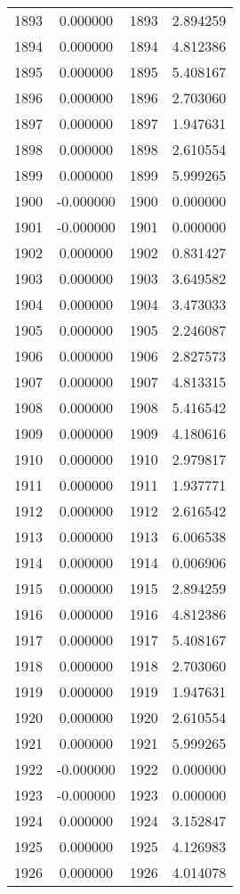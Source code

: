\documentclass[12pt]{article}
\begin{document}
\begin{longtable}{@{}cccc@{}}
1893 & 0.000000 & 1893 & 2.894259 \\
1894 & 0.000000 & 1894 & 4.812386 \\
1895 & 0.000000 & 1895 & 5.408167 \\
1896 & 0.000000 & 1896 & 2.703060 \\
1897 & 0.000000 & 1897 & 1.947631 \\
1898 & 0.000000 & 1898 & 2.610554 \\
1899 & 0.000000 & 1899 & 5.999265 \\
1900 & -0.000000 & 1900 & 0.000000 \\
1901 & -0.000000 & 1901 & 0.000000 \\
1902 & 0.000000 & 1902 & 0.831427 \\
1903 & 0.000000 & 1903 & 3.649582 \\
1904 & 0.000000 & 1904 & 3.473033 \\
1905 & 0.000000 & 1905 & 2.246087 \\
1906 & 0.000000 & 1906 & 2.827573 \\
1907 & 0.000000 & 1907 & 4.813315 \\
1908 & 0.000000 & 1908 & 5.416542 \\
1909 & 0.000000 & 1909 & 4.180616 \\
1910 & 0.000000 & 1910 & 2.979817 \\
1911 & 0.000000 & 1911 & 1.937771 \\
1912 & 0.000000 & 1912 & 2.616542 \\
1913 & 0.000000 & 1913 & 6.006538 \\
1914 & 0.000000 & 1914 & 0.006906 \\
1915 & 0.000000 & 1915 & 2.894259 \\
1916 & 0.000000 & 1916 & 4.812386 \\
1917 & 0.000000 & 1917 & 5.408167 \\
1918 & 0.000000 & 1918 & 2.703060 \\
1919 & 0.000000 & 1919 & 1.947631 \\
1920 & 0.000000 & 1920 & 2.610554 \\
1921 & 0.000000 & 1921 & 5.999265 \\
1922 & -0.000000 & 1922 & 0.000000 \\
1923 & -0.000000 & 1923 & 0.000000 \\
1924 & 0.000000 & 1924 & 3.152847 \\
1925 & 0.000000 & 1925 & 4.126983 \\
1926 & 0.000000 & 1926 & 4.014078 \\

\end{longtable}
\end{document}
